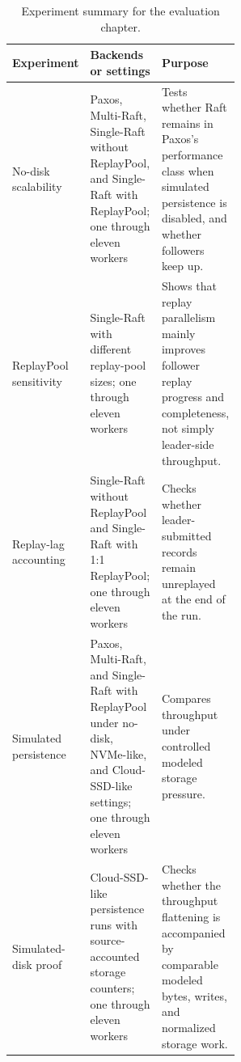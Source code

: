 \begin{table}[htbp]
\centering
\caption[Experiment summary]{Experiment summary for the evaluation chapter.}
\label{tab:appendix-experiment-summary}
\small
\begin{tabularx}{\linewidth}{@{}>{\raggedright\arraybackslash}p{0.24\linewidth}
>{\raggedright\arraybackslash}p{0.32\linewidth}
X@{}}
\toprule
\textbf{Experiment} & \textbf{Backends or settings} & \textbf{Purpose} \\
\midrule
No-disk scalability &
Paxos, Multi-Raft, Single-Raft without ReplayPool, and Single-Raft with
ReplayPool; one through eleven workers &
Tests whether Raft remains in Paxos's performance class when simulated
persistence is disabled, and whether followers keep up. \\
\addlinespace
ReplayPool sensitivity &
Single-Raft with different replay-pool sizes; one through eleven workers &
Shows that replay parallelism mainly improves follower replay progress and
completeness, not simply leader-side throughput. \\
\addlinespace
Replay-lag accounting &
Single-Raft without ReplayPool and Single-Raft with 1:1 ReplayPool; one through
eleven workers &
Checks whether leader-submitted records remain unreplayed at the end of the
run. \\
\addlinespace
Simulated persistence &
Paxos, Multi-Raft, and Single-Raft with ReplayPool under no-disk, NVMe-like,
and Cloud-SSD-like settings; one through eleven workers &
Compares throughput under controlled modeled storage pressure. \\
\addlinespace
Simulated-disk proof &
Cloud-SSD-like persistence runs with source-accounted storage counters; one
through eleven workers &
Checks whether the throughput flattening is accompanied by comparable modeled
bytes, writes, and normalized storage work. \\
\bottomrule
\end{tabularx}
\end{table}
